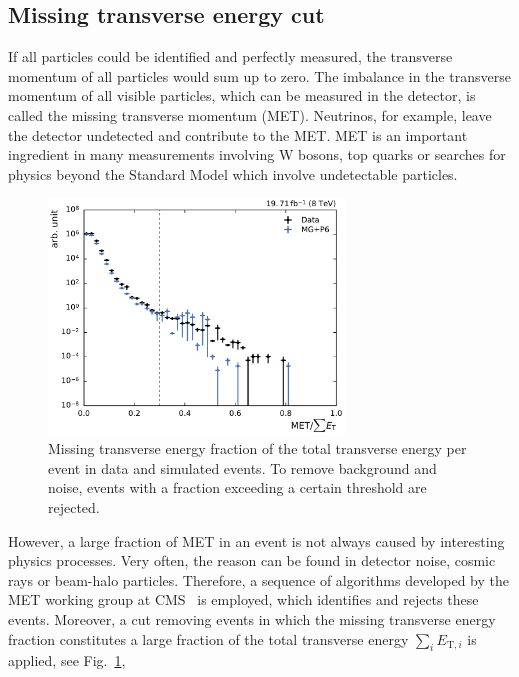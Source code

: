 \subsection{Missing transverse energy cut}

If all particles could be identified and perfectly measured, the transverse
momentum of all particles would sum up to zero. The imbalance in the transverse
momentum of all visible particles, which can be measured in the detector, is
called the missing transverse momentum (MET). Neutrinos, for example, leave the
detector undetected and contribute to the MET. MET is an important ingredient
in many measurements involving W bosons, top quarks or searches for physics
beyond the Standard Model which involve undetectable particles. 

\begin{figure}[htbp]
    \centering
    \includegraphics[width=0.7\textwidth]{figures/measurement/metoversumet.pdf}
    \caption[Missing transverse energy distribution]{Missing transverse energy
    fraction of the total transverse energy per event in data and simulated
    events. To remove background and noise, events with a fraction exceeding a
    certain threshold are rejected.}
    \label{fig:mc:met_fraction}
\end{figure}

However, a large fraction of MET in an event is not always caused by interesting
physics processes. Very often, the reason can be found in detector noise, cosmic
rays or beam-halo particles. Therefore, a sequence of algorithms developed by
the MET working group at CMS~\cite{jetmet:metfilters} is employed, which
identifies and rejects these events. Moreover, a cut removing events in which
the missing transverse energy fraction \met constitutes a large fraction of the
total transverse energy $\sum_i E_{\mathrm{T},i}$ is applied, see
Fig.~\ref{fig:mc:met_fraction},

